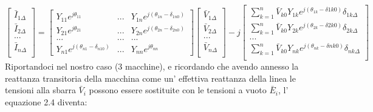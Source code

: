 \documentclass[Lau,noexaminfo]{sapthesis}
\begin{document}
	\begin{equation}
	\begin{bmatrix}
	\bar{I}_{1\Delta}\\
	\bar{I}_{2\Delta}\\
	...\\
	\bar{I}_{n\Delta}\\
	\end{bmatrix}=
	\begin{bmatrix}
	Y_{11}e^{j\theta_{11}} & ... & Y_{1n}e^{j(\theta_{1n}-\delta_{1n0})}\\
	Y_{21}e^{j\theta_{21}} & ... & Y_{2n}e^{j(\theta_{2n}-\delta_{2n0})}\\
	... & ... & ...\\
	Y_{n1}e^{j(\theta_{n1}-\delta_{n10})} & ... & Y_{nn}e^{j\theta_{nn}}
	\end{bmatrix}
	\begin{bmatrix}
	\bar{V}_{1\Delta}\\
	\bar{V}_{2\Delta}\\
	...\\
	\bar{V}_{n\Delta}\\
	\end{bmatrix}-j
	\begin{bmatrix}
	\sum_{k=1}^{n}\bar{V}_{k0}Y_{1k}e^{j(\theta_{1k}-\delta{1k0})}\delta_{1k\Delta}\\
	\sum_{k=1}^{n}\bar{V}_{k0}Y_{2k}e^{j(\theta_{2k}-\delta{2k0})}\delta_{2k\Delta}\\
	...\\
	\sum_{k=1}^{n}\bar{V}_{k0}Y_{nk}e^{j(\theta_{nk}-\delta{nk0})}\delta_{nk\Delta}\\
	\end{bmatrix}
	\end{equation}
	Riportandoci nel nostro caso (3 macchine), e ricordando che avendo annesso la reattanza transitoria della macchina come un' effettiva reattanza della linea le tensioni alla sbarra $\bar{V}_i$ possono essere sostituite con le tensioni a vuoto $\bar{E}_i$, l' equazione 2.4 diventa:\\
\end{document}
